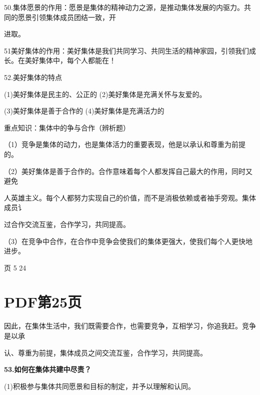 \documentclass[lang=cn,11pt]{elegantbook}
\begin{document}
50.集体愿景的作用：愿景是集体的精神动力之源，是推动集体发展的内驱力。共同的愿景引领集体成员团结一致，开\par

进取。\par

51美好集体的作用：美好集体是我们共同学习、共同生活的精神家园，引领我们成长。在美好集体中，每个人都能在！\par

52.美好集体的特点\par

(1)美好集体是民主的、公正的 (2)美好集体是充满关怀与友爱的。\par

(3)美好集体是善于合作的 (4)美好集体是充满活力的\par

重点知识：集体中的争与合作（辨析题）\par

（1）竞争是集体的动力，也是集体活力的重要表现，他是以承认和尊重为前提的。\par

（2）美好集体是善于合作的。合作意味着每个人都发挥自己最大的作用，同时又避免\par

人英雄主义。每个人都努力实现自己的价值，而不是消极依赖或者袖手旁观。集体成员讠\par

过合作交流互鉴，合作学习，共同提高。\par

（3）在竞争中合作，在合作中竞争会使我们的集体更强大，使我们每个人更快地进步。\par

页 5 24\par


\section*{PDF第25页}

因此，在集体生活中，我们既需要合作，也需要竞争，互相学习，你追我赶。竞争是以承\par

认、尊重为前提，集体成员之间交流互鉴，合作学习，共同提高。\par

\textbf{53.如何在集体共建中尽责？}\par

(1)积极参与集体共同愿景和目标的制定，并予以理解和认同。\par
\end{document}
